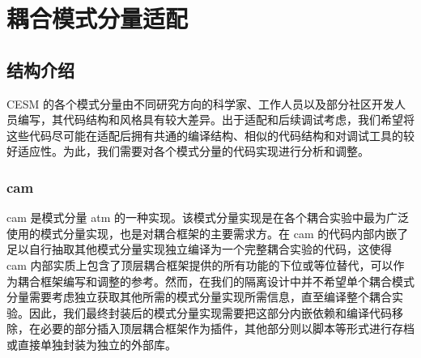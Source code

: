 \chapter{耦合模式分量适配}
\label{cha:refactor}

\section{结构介绍}

CESM 的各个模式分量由不同研究方向的科学家、工作人员以及部分社区开发人员编写，其代码结构和风格具有较大差异。出于适配和后续调试考虑，我们希望将这些代码尽可能在适配后拥有共通的编译结构、相似的代码结构和对调试工具的较好适应性。为此，我们需要对各个模式分量的代码实现进行分析和调整。

\subsection{cam}

cam \cite{CAMdoc}是模式分量 atm 的一种实现。该模式分量实现是在各个耦合实验中最为广泛使用的模式分量实现，也是对耦合框架的主要需求方。在 cam 的代码内部内嵌了足以自行抽取其他模式分量实现独立编译为一个完整耦合实验的代码，这使得 cam 内部实质上包含了顶层耦合框架提供的所有功能的下位或等位替代，可以作为耦合框架编写和调整的参考。然而，在我们的隔离设计中并不希望单个耦合模式分量需要考虑独立获取其他所需的模式分量实现所需信息，直至编译整个耦合实验。因此，我们最终封装后的模式分量实现需要把这部分内嵌依赖和编译代码移除，在必要的部分插入顶层耦合框架作为插件，其他部分则以脚本等形式进行存档或直接单独封装为独立的外部库。

